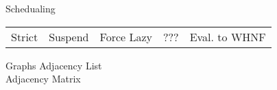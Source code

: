 \documentclass{beamer}
\begin{document}
\begin{slide}{}
  
\end{slide}


\begin{slide}{Schedualing}
  \begin{tabular}{ c c c }
    Strict & Suspend & Force
    Lazy & ??? & Eval. to WHNF
  \end{tabular}

  
\end{slide}




\begin{slide}{Graphs}
  Adjacency List \\
  Adjacency Matrix \\
  
\end{slide}
\end{document}
